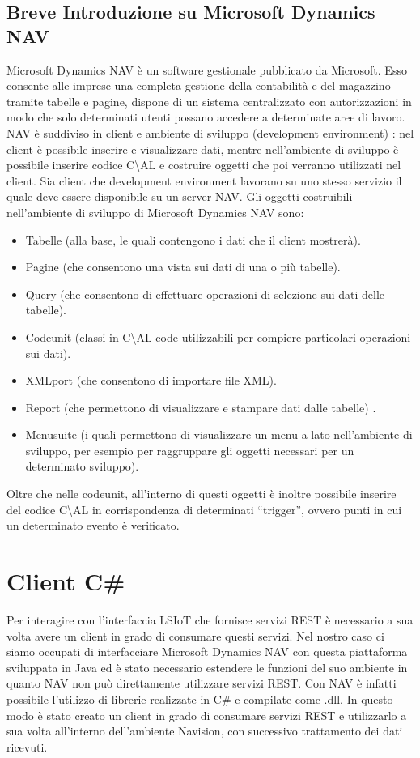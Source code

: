 \subsection{Breve Introduzione su Microsoft Dynamics NAV}
Microsoft Dynamics NAV è un software gestionale pubblicato da Microsoft. Esso consente alle imprese una completa gestione della contabilità e del magazzino tramite tabelle e pagine, dispone di un sistema centralizzato con autorizzazioni in modo che solo determinati utenti possano accedere a determinate aree di lavoro. NAV è suddiviso in client e ambiente di sviluppo (development environment) : nel client è possibile inserire e visualizzare dati, mentre nell’ambiente di sviluppo è possibile inserire codice C\textbackslash AL e costruire oggetti che poi verranno utilizzati nel client. Sia client che development environment lavorano su uno stesso servizio il quale deve essere disponibile su un server NAV. \newline
Gli oggetti costruibili nell’ambiente di sviluppo di Microsoft Dynamics NAV sono: 
\begin{itemize}
\item Tabelle (alla base, le quali contengono i dati che il client mostrerà).
\item Pagine (che consentono una vista sui dati di una o più tabelle).
\item Query (che consentono di effettuare operazioni di selezione sui dati delle tabelle).
\item Codeunit (classi in C\textbackslash AL code utilizzabili per compiere particolari operazioni sui dati).
\item XMLport (che consentono di importare file XML).
\item Report (che permettono di visualizzare e stampare dati dalle tabelle) .
\item Menusuite (i quali permettono di visualizzare un menu a lato nell’ambiente di sviluppo, per esempio per raggruppare gli oggetti necessari per un determinato sviluppo).
\end{itemize}
Oltre che nelle codeunit, all’interno di questi oggetti è inoltre possibile inserire del codice C\textbackslash AL in corrispondenza di determinati “trigger”, ovvero punti in cui un determinato evento è verificato. 
\section{Client C\#}
Per interagire con l’interfaccia LSIoT che fornisce servizi REST è necessario a sua volta avere un client in grado di consumare questi servizi. Nel nostro caso ci siamo occupati di interfacciare Microsoft Dynamics NAV con questa piattaforma sviluppata in Java ed è stato necessario estendere le funzioni del suo ambiente in quanto NAV non può direttamente utilizzare servizi REST. Con NAV è infatti possibile l’utilizzo di librerie realizzate in C\# e compilate come .dll. In questo modo è stato creato un client in grado di consumare servizi REST e utilizzarlo a sua volta all’interno dell’ambiente Navision, con successivo trattamento dei dati ricevuti.
\clearpage
